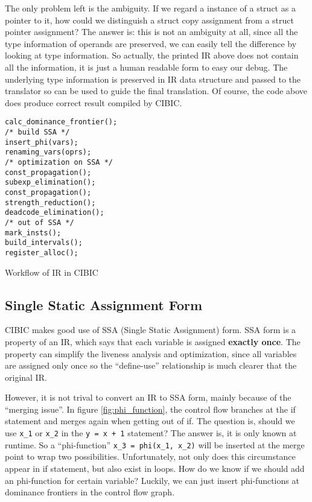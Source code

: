 \documentclass[10pt, a4paper]{article}
\begin{document}
\begin{enumerate}
    The only problem left is the ambiguity. If we regard a instance of a struct
    as a pointer to it, how could we distinguish a struct copy assignment from
    a struct pointer assignment? The answer is: this is not an ambiguity at
    all, since all the type information of operands are preserved, we can
    easily tell the difference by looking at type information. So actually, the
    printed IR above does not contain all the information, it is just a human
    readable form to easy our debug. The underlying type information is
    preserved in IR data structure and passed to the translator so can be used
    to guide the final translation. Of course, the code above does produce
    correct result compiled by CIBIC.
\end{enumerate}

\begin{listing}[H]
    \centering
    \begin{verbatim}
calc_dominance_frontier();
/* build SSA */
insert_phi(vars);
renaming_vars(oprs);
/* optimization on SSA */
const_propagation();
subexp_elimination();
const_propagation();
strength_reduction();
deadcode_elimination();
/* out of SSA */
mark_insts();
build_intervals();
register_alloc();
    \end{verbatim}
    \caption{Workflow of IR in CIBIC}
\end{listing}

\subsection{Single Static Assignment Form}
CIBIC makes good use of SSA (Single Static Assignment) form. SSA form is a
property of an IR, which says that each variable is assigned \textbf{exactly
once}. The property can simplify the liveness analysis and optimization, since
all variables are assigned only once so the ``define-use'' relationship is much
clearer that the original IR.

However, it is not trival to convert an IR to SSA form, mainly because of the
``merging issue''. In figure \ref{fig:phi_function}, the control flow branches
at the if statement and merges again when getting out of if. The question is,
should we use \texttt{x\_1} or \texttt{x\_2} in the \texttt{y = x + 1}
statement? The answer is, it is only known at runtime. So a ``phi-function''
\texttt{x\_3 = phi(x\_1, x\_2)} will be inserted at the merge point to wrap two
possibilities.  Unfortunately, not only does this circumstance appear in if
statement, but also exist in loops. How do we know if we should add an
phi-function for certain variable? Luckily, we can just insert phi-functions at
dominance frontiers in the control flow graph.
\end{document}
